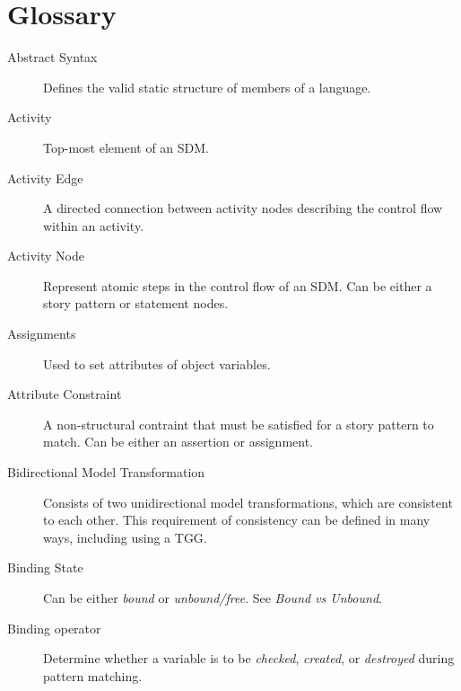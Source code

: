 % 
% 

\newpage
\genHeader
\hypertarget{glossary}{}
\section{Glossary}


\begin{description}

\item[Abstract Syntax] %
Defines the valid static structure of members of a language. 

\item[Activity] %
Top-most element of an SDM.

\item[Activity Edge] %
A directed connection between activity nodes describing the control flow within an activity.

\item[Activity Node] %
Represent atomic steps in the control flow of an SDM. Can be either a story pattern or statement nodes.

\item[Assignments] %
Used to set attributes of object variables.

\item[Attribute Constraint] %
A non-structural contraint that must be satisfied for a story pattern to match. Can be either an assertion or assignment.

\item[Bidirectional Model Transformation] %
Consists of two unidirectional model transformations, which are consistent to each other. This requirement of
consistency can be defined in many ways, including using a TGG.

\item[Binding State] %
Can be either \emph{bound} or \emph{unbound/free}. See \emph{Bound vs Unbound}.

\item[Binding operator] %
Determine whether a variable is to be \emph{checked}, \emph{created}, or \emph{destroyed} during pattern matching.


\end{description}
